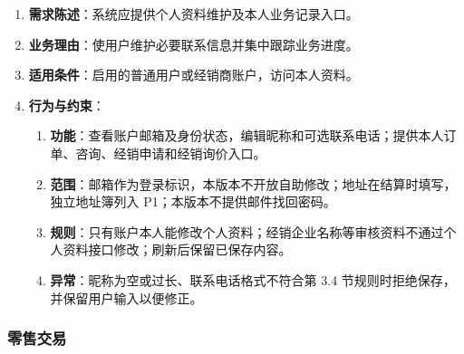 \begin{enumerate}
\item {\bfseries 需求陈述}：系统应提供个人资料维护及本人业务记录入口。
\item {\bfseries 业务理由}：使用户维护必要联系信息并集中跟踪业务进度。
\item {\bfseries 适用条件}：启用的普通用户或经销商账户，访问本人资料。
\item {\bfseries 行为与约束}：
\begin{enumerate}
\item {\bfseries 功能}：查看账户邮箱及身份状态，编辑昵称和可选联系电话；提供本人订单、咨询、经销申请和经销询价入口。
\item {\bfseries 范围}：邮箱作为登录标识，本版本不开放自助修改；地址在结算时填写，独立地址簿列入 P1；本版本不提供邮件找回密码。
\item {\bfseries 规则}：只有账户本人能修改个人资料；经销企业名称等审核资料不通过个人资料接口修改；刷新后保留已保存内容。
\item {\bfseries 异常}：昵称为空或过长、联系电话格式不符合第 3.4 节规则时拒绝保存，并保留用户输入以便修正。
\end{enumerate}

\end{enumerate}

\subsubsection{零售交易}\label{sec:323-零售交易}


